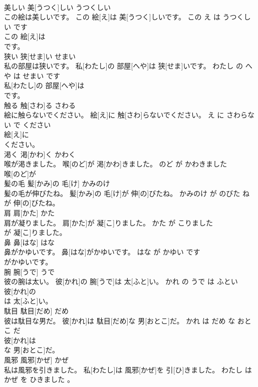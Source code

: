 \documentclass[8pt]{extreport}
\begin{document}
\begin{CJK}{UTF8}{min}
\\	美しい	美[うつく]しい	うつくしい	
\\	この絵は美しいです。	この 絵[え]は 美[うつく]しいです。	この え は うつくしい です	
\\	この 絵[え]は
\\	です。			
\\	狭い	狭[せま]い	せまい	
\\	私の部屋は狭いです。	私[わたし]の 部屋[へや]は 狭[せま]いです。	わたし の へや は せまい です	
\\	私[わたし]の 部屋[へや]は
\\	です。			
\\	触る	触[さわ]る	さわる	
\\	絵に触らないでください。	絵[え]に 触[さわ]らないでください。	え に さわらない で ください	
\\	絵[え]に
\\	ください。			
\\	渇く	渇[かわ]く	かわく	
\\	喉が渇きました。	喉[のど]が 渇[かわ]きました。	のど が かわきました	
\\	喉[のど]が
\\	髪の毛	髪[かみ]の 毛[け]	かみのけ	
\\	髪の毛が伸びたね。	髪[かみ]の 毛[け]が 伸[の]びたね。	かみのけ が のびた ね	
\\	が 伸[の]びたね。			
\\	肩	肩[かた]	かた	
\\	肩が凝りました。	肩[かた]が 凝[こ]りました。	かた が こりました	
\\	が 凝[こ]りました。			
\\	鼻	鼻[はな]	はな	
\\	鼻がかゆいです。	鼻[はな]がかゆいです。	はな が かゆい です	
\\	がかゆいです。			
\\	腕	腕[うで]	うで	
\\	彼の腕は太い。	彼[かれ]の 腕[うで]は 太[ふと]い。	かれ の うで は ふとい	
\\	彼[かれ]の
\\	は 太[ふと]い。			
\\	駄目	駄目[だめ]	だめ	
\\	彼は駄目な男だ。	彼[かれ]は 駄目[だめ]な 男[おとこ]だ。	かれ は だめ な おとこ だ	
\\	彼[かれ]は
\\	な 男[おとこ]だ。			
\\	風邪	風邪[かぜ]	かぜ	
\\	私は風邪を引きました。	私[わたし]は 風邪[かぜ]を 引[ひ]きました。	わたし は かぜ を ひきました 。	

\end{CJK}
\end{document}
